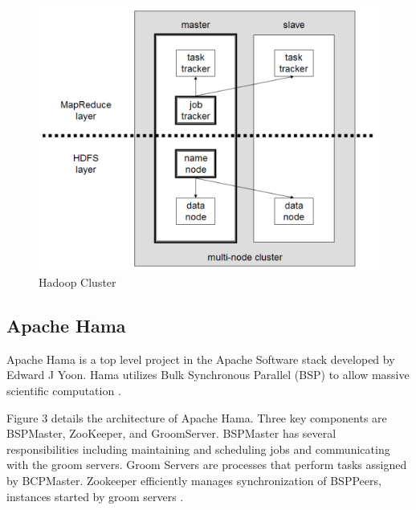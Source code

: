 \documentclass[9pt,twocolumn,twoside]{../../styles/osajnl}
\begin{document}
\begin{figure}[ht]
  \includegraphics[scale=0.45]{images/hadoop-architecture.png}
  \caption{Hadoop Cluster \cite{www-wikihadoop}}
\end{figure}




\subsection{Apache Hama}

Apache Hama is a top level project in the Apache Software stack developed by Edward J Yoon.  Hama utilizes  Bulk Synchronous Parallel (BSP) to allow massive scientific computation \cite{www-wikihama}. 

Figure 3 details the architecture of Apache Hama.  Three key components are BSPMaster, ZooKeeper, and GroomServer. BSPMaster has several responsibilities including maintaining and scheduling jobs and communicating with the groom servers.  Groom Servers are processes that perform tasks assigned by BCPMaster.  Zookeeper efficiently manages synchronization of BSPPeers, instances started by groom servers \cite{www-wikihama}. 
\end{document}
